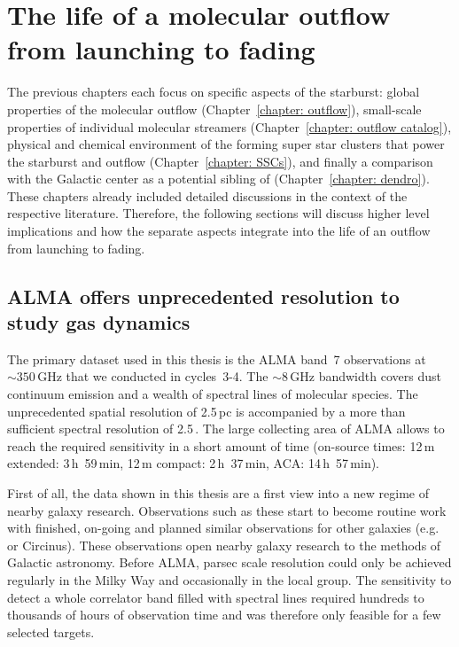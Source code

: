 
\chapter{The life of a molecular outflow from launching to fading}
\label{chapter: joint discussion}



The previous chapters each focus on specific aspects of the  starburst: global properties of the molecular outflow (Chapter~\ref{chapter: outflow}), small-scale properties of individual molecular streamers (Chapter~\ref{chapter: outflow catalog}), physical and chemical environment of the forming super star clusters that power the starburst and outflow (Chapter~\ref{chapter: SSCs}), and finally a comparison with the Galactic center as a potential sibling of  (Chapter~\ref{chapter: dendro}).
These chapters already included detailed discussions in the context of the respective literature. Therefore, the following sections will discuss higher level implications and how the separate aspects integrate into the life of an outflow from launching to fading.


\section{ALMA offers unprecedented resolution to study gas dynamics}

The primary dataset used in this thesis is the ALMA band~7 observations at $\sim 350$\,GHz that we conducted in cycles~3-4. The $\sim 8$\,GHz bandwidth covers dust continuum emission and a wealth of spectral lines of molecular species.
The unprecedented spatial resolution of 2.5\,pc is accompanied by a more than sufficient spectral resolution of 2.5\,\kms.
The large collecting area of ALMA allows to reach the required sensitivity in a short amount of time (on-source times: 12\,m extended: 3\,h~59\,min, 12\,m compact: 2\,h~37\,min, ACA: 14\,h~57\,min).

First of all, the data shown in this thesis are a first view into a new regime of nearby galaxy research. Observations such as these start to become routine work with finished, on-going and planned similar observations for other galaxies (e.g.  or Circinus).
These observations open nearby galaxy research to the methods of Galactic astronomy.
Before ALMA, parsec scale resolution could only be achieved regularly in the Milky Way and occasionally in the local group. The sensitivity to detect a whole correlator band filled with spectral lines required hundreds to thousands of hours of observation time and was therefore only feasible for a few selected targets.

